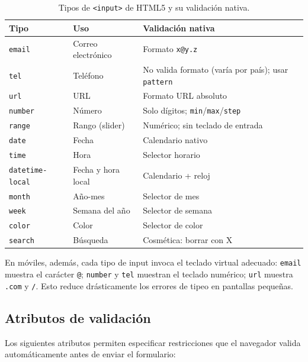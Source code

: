 \begin{table}[htbp]
\centering
\caption{Tipos de \texttt{<input>} de HTML5 y su validación nativa.}
\label{tab:input-types}
\footnotesize
\begin{tabularx}{\textwidth}{lXX}
\toprule
\textbf{Tipo} & \textbf{Uso} & \textbf{Validación nativa}\\
\midrule
\texttt{email} & Correo electrónico & Formato \texttt{x@y.z}\\
\texttt{tel} & Teléfono & No valida formato (varía por país); usar \texttt{pattern}\\
\texttt{url} & URL & Formato URL absoluto\\
\texttt{number} & Número & Solo dígitos; \texttt{min}/\texttt{max}/\allowbreak\texttt{step}\\
\texttt{range} & Rango (slider) & Numérico; sin teclado de entrada\\
\texttt{date} & Fecha & Calendario nativo\\
\texttt{time} & Hora & Selector horario\\
\texttt{datetime-local} & Fecha y hora local & Calendario + reloj\\
\texttt{month} & Año-mes & Selector de mes\\
\texttt{week} & Semana del año & Selector de semana\\
\texttt{color} & Color & Selector de color\\
\texttt{search} & Búsqueda & Cosmética: borrar con X\\
\bottomrule
\end{tabularx}
\end{table}

En móviles, además, cada tipo de input invoca el teclado virtual
adecuado: \texttt{email} muestra el carácter \texttt{@};
\texttt{number} y \texttt{tel} muestran el teclado numérico;
\texttt{url} muestra \texttt{.com} y \texttt{/}. Esto reduce
drásticamente los errores de tipeo en pantallas pequeñas.

\subsection{Atributos de validación}

Los siguientes atributos permiten especificar restricciones que el
navegador valida automáticamente antes de enviar el formulario:


